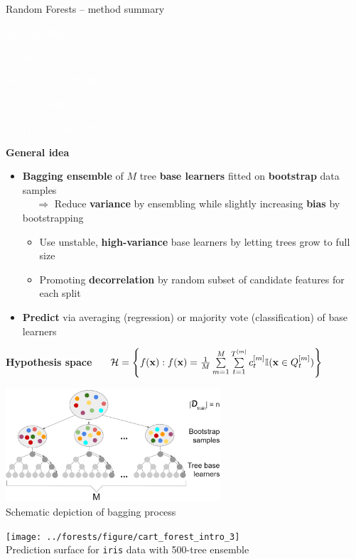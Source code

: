 \documentclass[11pt,compress,t,notes=noshow, xcolor=table]{beamer}
\newcommand{\highlight}[1]{\textcolor{hlcol}{\textbf{#1}}}
\newcommand{\maketag}[2][100]{
  \colorbox{hlcol!#1}{\textcolor{white}{\MakeUppercase{\scriptsize #2}} 
  \vphantom{}}
}
\begin{document}
\begin{frame2}{Random Forests -- method summary}

\maketag{regression} \maketag{classification}
\maketag{NONPARAMETRIC} \maketag[50]{BLACK-BOX} \maketag{FEATURE SELECTION}

\medskip

\highlight{General idea} 
\begin{itemize}
  \item \textbf{Bagging ensemble} of $M$ tree \textbf{base learners} fitted on \textbf{bootstrap} data samples\\
   ~~ $\Rightarrow$ Reduce \textbf{variance} by ensembling while slightly increasing \textbf{bias} by bootstrapping  
   \begin{itemize}
    \item Use unstable, \textbf{high-variance} base learners by letting trees grow to full size
    \item Promoting \textbf{decorrelation} by random subset of candidate features for each split
  \end{itemize}
  \item \textbf{Predict} via averaging (regression) or majority vote (classification) of base learners
\end{itemize}

\medskip

\highlight{Hypothesis space} ~~
$\mathcal{H} = \left\{ f(\mathbf{x}): f(\mathbf{x}) = \frac{1}{M} \sum\limits_{m = 1}^M 
\sum\limits_{t = 1}^{T^{[m]}} 
c_t^{[m]} \mathbb{I}(\mathbf{x} \in Q_t^{[m]}) \right\}$


\begin{minipage}[b]{0.65\textwidth}
  \centering
  \includegraphics[width=0.6\textwidth]{figure/rf-bagging} \\
  \tiny Schematic depiction of bagging process
\end{minipage}%
\begin{minipage}[b]{0.35\textwidth}
\centering
  \texttt{[image: 
  ../forests/figure/cart\_forest\_intro\_3]} \\
  \tiny Prediction surface for \texttt{iris} data with 500-tree ensemble
\end{minipage}


\end{frame2}
\end{document}
